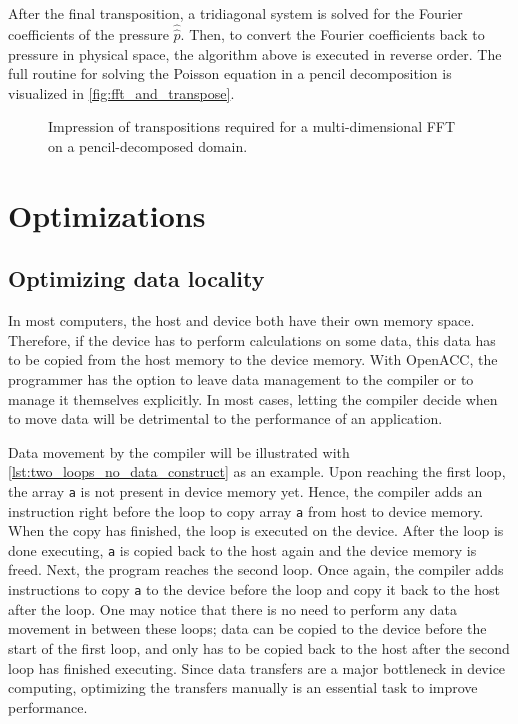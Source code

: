 After the final transposition, a tridiagonal system is solved for the Fourier coefficients of the pressure $\hat{\hat{p}}$. Then, to convert the Fourier coefficients back to pressure in physical space, the algorithm above is executed in reverse order. The full routine for solving the Poisson equation in a pencil decomposition is visualized in \autoref{fig:fft_and_transpose}.

\begin{figure}[H]
  \centering
  
  \caption{Impression of transpositions required for a multi-dimensional FFT on a pencil-decomposed domain.}
  \label{fig:fft_and_transpose}
\end{figure}

\section{Optimizations}

\subsection{Optimizing data locality}
In most computers, the host and device both have their own memory space. Therefore, if the device has to perform calculations on some data, this data has to be copied from the host memory to the device memory. With OpenACC, the programmer has the option to leave data management to the compiler or to manage it themselves explicitly. In most cases, letting the compiler decide when to move data will be detrimental to the performance of an application.

Data movement by the compiler will be illustrated with \autoref{lst:two_loops_no_data_construct} as an example. Upon reaching the first loop, the array \texttt{a} is not present in device memory yet. Hence, the compiler adds an instruction right before the loop to copy array \texttt{a} from host to device memory. When the copy has finished, the loop is executed on the device. After the loop is done executing, \texttt{a} is copied back to the host again and the device memory is freed. Next, the program reaches the second loop. Once again, the compiler adds instructions to copy \texttt{a} to the device before the loop and copy it back to the host after the loop. One may notice that there is no need to perform any data movement in between these loops; data can be copied to the device before the start of the first loop, and only has to be copied back to the host after the second loop has finished executing. Since data transfers are a major bottleneck in device computing, optimizing the transfers manually is an essential task to improve performance. 


